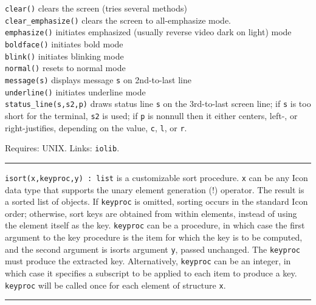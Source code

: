 \texttt{clear()} clears the screen (tries several methods)\\
\texttt{clear\_emphasize()} clears the screen to all-emphasize
mode.\\
\texttt{emphasize()} initiates emphasized (usually reverse video dark on
light) mode\\
\texttt{boldface()} initiates bold mode\\
\texttt{blink()} initiates blinking mode\\
\texttt{normal()} resets to normal mode\\
\texttt{message(s)} displays message \texttt{s} on 2nd-to-last
line\\
\texttt{underline()} initiates underline mode\\
\texttt{status\_line(s,s2,p)} draws status line \texttt{s} on the
3rd-to-last screen line; if \texttt{s} is too short for the terminal,
\texttt{s2} is used; if \texttt{p} is nonnull then it either centers,
left-, or right-justifies, depending on the value,
\texttt{{\textquotedbl}c{\textquotedbl}},
\texttt{{\textquotedbl}l{\textquotedbl}}, or
\texttt{{\textquotedbl}r{\textquotedbl}}.

Requires: UNIX. Links: \texttt{iolib}.

\vspace{0.25cm}\hrule{}

\texttt{i}\texttt{sort}\texttt{(x,keyproc,y) : list} is a
customizable sort procedure. \texttt{x} can be any Icon data type that
supports the unary element generation (!) operator. The result is a
sorted list of objects. If \texttt{keyproc} is omitted, sorting occurs
in the standard Icon order; otherwise, sort keys are obtained from
within elements, instead of using the element itself as the key.
\texttt{keyproc} can be a procedure, in which case the first argument
to the key procedure is the item for which the key is to be computed,
and the second argument is isort{\textquotesingle}s argument
\texttt{y}, passed unchanged. The \texttt{keyproc} must produce the
extracted key. Alternatively, \texttt{keyproc} can be an integer, in
which case it specifies a subscript to be applied to each item to
produce a key. \texttt{keyproc} will be called once for each element of
structure \texttt{x}.

\vspace{0.25cm}\hrule{}


